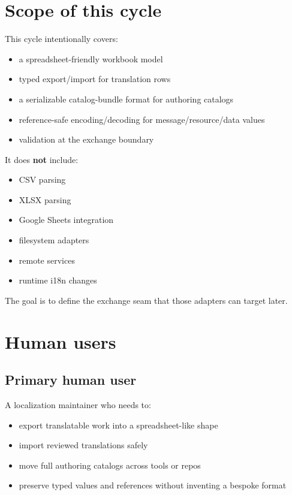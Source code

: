 \section{Scope of this cycle}\label{record-190-scope-of-this-cycle}

This cycle intentionally covers:

\begin{itemize}
\tightlist
\item
  a spreadsheet-friendly workbook model
\item
  typed export/import for translation rows
\item
  a serializable catalog-bundle format for authoring catalogs
\item
  reference-safe encoding/decoding for message/resource/data values
\item
  validation at the exchange boundary
\end{itemize}

It does \textbf{not} include:

\begin{itemize}
\tightlist
\item
  CSV parsing
\item
  XLSX parsing
\item
  Google Sheets integration
\item
  filesystem adapters
\item
  remote services
\item
  runtime i18n changes
\end{itemize}

The goal is to define the exchange seam that those adapters can target later.

\section{Human users}\label{record-190-human-users}

\subsection{Primary human user}\label{record-190-primary-human-user}

A localization maintainer who needs to:

\begin{itemize}
\tightlist
\item
  export translatable work into a spreadsheet-like shape
\item
  import reviewed translations safely
\item
  move full authoring catalogs across tools or repos
\item
  preserve typed values and references without inventing a bespoke format
\end{itemize}

